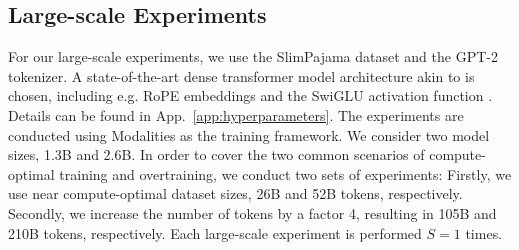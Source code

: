 \subsection{Large-scale Experiments}
\label{sec:experiments_L}
For our large-scale experiments, we use the SlimPajama dataset \cite{cerebras2023slimpajama} and the GPT-2 tokenizer. A state-of-the-art dense transformer model architecture akin to \cite{touvron2023llama2openfoundation} 
is chosen, including e.g. RoPE embeddings \cite{su2023roformerenhancedtransformerrotary} and the SwiGLU activation function \cite{shazeer2020gluvariantsimprovetransformer}.
Details can be found in App.~\ref{app:hyperparameters}. The experiments are conducted using Modalities \cite{modalities} as the training framework.
We consider two model sizes, 1.3B and 2.6B. In order to cover the two common scenarios of compute-optimal training and overtraining, we conduct two sets of experiments: Firstly, we use near compute-optimal dataset sizes, 26B and 52B tokens, respectively. Secondly, we increase the number of tokens by a factor 4, resulting in 105B and 210B tokens, respectively.
Each large-scale experiment is performed $S = 1$ times.

